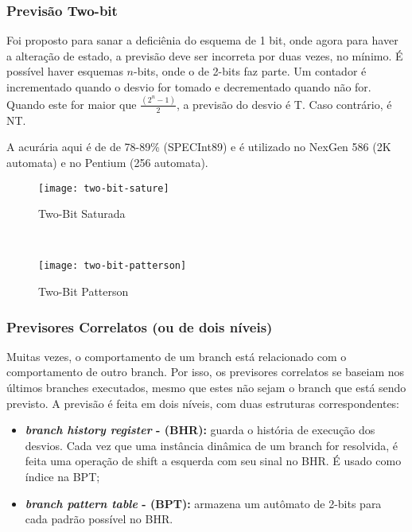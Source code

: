 \subsubsection{Previsão Two-bit}

Foi proposto para sanar a deficiênia do esquema de 1 bit, onde agora para haver a alteração de estado, a previsão deve ser incorreta por duas vezes, no mínimo. É possível haver esquemas $n$-bits, onde o de 2-bits faz parte. Um contador é incrementado quando o desvio for tomado e decrementado quando não for. Quando este for maior que $\frac{(2^n - 1)}{2}$, a previsão do desvio é T. Caso contrário, é NT.

A acurária aqui é de de 78-89\% (SPECInt89) e é utilizado no NexGen 586 (2K automata) e no Pentium (256 automata).

\begin{figure*}
  \begin{subfigure}{.5\textwidth}
    \centering
    \texttt{[image: two-bit-sature]}
    \caption{Two-Bit Saturada}
    \label{fig:two-bit-sature}
  \end{subfigure}
  ~
  \begin{subfigure}{.5\textwidth}
    \centering
    \texttt{[image: two-bit-patterson]}
    \caption{Two-Bit Patterson}
    \label{fig:two-bit-patterson}
  \end{subfigure}
\end{figure*}




\subsubsection{Previsores Correlatos (ou de dois níveis)}

Muitas vezes, o comportamento de um branch está relacionado com o comportamento de outro branch. Por isso, os previsores correlatos se baseiam nos últimos branches executados, mesmo que estes não sejam o branch que está sendo previsto. A previsão é feita em dois níveis, com duas estruturas correspondentes:
\begin{itemize}
  \item \textbf{\textit{branch history register} - (BHR):} guarda o história de execução dos desvios. Cada vez que uma instância dinâmica de um branch for resolvida, é feita uma operação de shift a esquerda com seu sinal no BHR. É usado como índice na BPT;

  \item \textbf{\textit{branch pattern table} - (BPT):} armazena um autômato de 2-bits para cada padrão possível no BHR.
\end{itemize}

